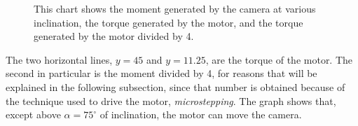 \documentclass[]{article}
\begin{document}
\begin{figure}[H]
	\centering
	\caption{This chart shows the moment generated by the camera at various inclination, the torque generated by the motor, and the torque generated by the motor divided by 4. }
	\label{fig:momentchart}
\end{figure}

The two horizontal lines, $y=45$ and $y=11.25$, are the torque of the motor. The second in particular is the moment divided by 4, for reasons that will be explained in the following subsection, since that number is obtained because of the technique used to drive the motor, \textit{microstepping}. The graph shows that, except above $\alpha = 75^{\circ}$ of inclination, the motor can move the camera. 
\end{document}
